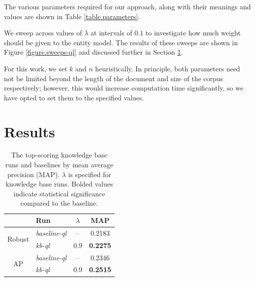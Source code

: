 \documentclass{sig-alternate}
\begin{document}
The various parameters required for our approach, along with their meanings and values are shown in Table \ref{table.parameters}. 

We sweep across values of $\lambda$ at intervals of $0.1$ to investigate how much weight should be given to the entity model. The results of these sweeps are shown in Figure \ref{figure.sweeps-ql} and discussed further in Section \ref{section.results}.

For this work, we set $k$ and $n$ heuristically. In principle, both parameters need not be limited beyond the length of the document and size of the corpus respectively; however, this would increase computation time significantly, so we have opted to set them to the specified values.

\section{Results}\label{section.results}

\begin{table}[htbp]
\centering
\begin{tabular}{|c|l|c|c|} \hline
& {\bf Run} & {\bf $\lambda$} & {\bf MAP} \\ \hline
\multirow{2}{*}{Robust} & {\it baseline-ql} & -- & 0.2183 \\ \cline{2-4}
& {\it kb-ql} & 0.9 & {\bf 0.2275} \\ \hline \hline %
\multirow{2}{*}{AP} & {\it baseline-ql} & -- & 0.2346 \\ \cline{2-4}
& {\it kb-ql} & 0.9 & {\bf 0.2515} \\ \hline %
\end{tabular}
\caption{The top-scoring knowledge base runs and baselines by mean average precision (MAP). $\lambda$ is specified for knowledge base runs. Bolded values indicate statistical significance compared to the baseline.}
\label{table.performance}
\end{table}
\end{document}
